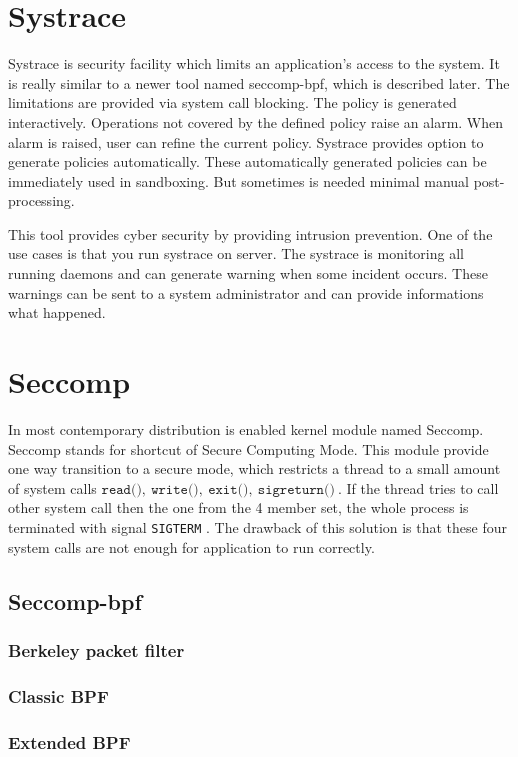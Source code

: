 \section{Systrace}
Systrace is security facility which limits an application's access to the system.
It is really similar to a newer tool named seccomp-bpf, which is described later.
The limitations are provided via system call blocking. 
The policy is generated interactively.
Operations not covered by the defined policy raise an alarm.
When alarm is raised, user can refine the current policy.
Systrace provides option to generate policies automatically. 
These automatically generated policies can be immediately used in sandboxing.
But sometimes is needed minimal manual post-processing.

This tool provides cyber security by providing intrusion prevention. 
One of the use cases is that you run systrace on server.
The systrace is monitoring all running daemons and can generate warning when some incident occurs.
These warnings can be sent to a system administrator and can provide informations what happened.

\section{Seccomp}
In most contemporary distribution is enabled kernel module named Seccomp\cite{seccomp_sandbox}.
Seccomp stands for shortcut of Secure Computing Mode.
This module provide one way transition to a secure mode, which restricts a thread to a small amount of system calls \( \texttt{read()},\ \texttt{write()},\ \texttt{exit()},\ \texttt{sigreturn()}\ \).
If the thread tries to call other system call then the one from the 4 member set, the whole process is terminated with signal \texttt{SIGTERM} . 
The drawback of this solution is that these four system calls are not enough for application to run correctly.

\subsection{Seccomp-bpf}
\subsubsection{Berkeley packet filter}
\subsubsection{Classic BPF}
\subsubsection{Extended BPF}

